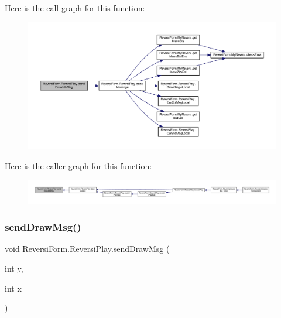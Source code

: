 Here is the call graph for this function\+:\nopagebreak
\begin{figure}[H]
\begin{center}
\leavevmode
\includegraphics[width=350pt]{class_reversi_form_1_1_reversi_play_a08062d3bd42d1780a6931b44a925503d_cgraph}
\end{center}
\end{figure}
Here is the caller graph for this function\+:\nopagebreak
\begin{figure}[H]
\begin{center}
\leavevmode
\includegraphics[width=350pt]{class_reversi_form_1_1_reversi_play_a08062d3bd42d1780a6931b44a925503d_icgraph}
\end{center}
\end{figure}
\mbox{\label{class_reversi_form_1_1_reversi_play_aaad592cdd92fb4efd6132c7cf1871e1f}} 
\subsubsection{\texorpdfstring{send\+Draw\+Msg()}{sendDrawMsg()}}
{\footnotesize\ttfamily void Reversi\+Form.\+Reversi\+Play.\+send\+Draw\+Msg (\begin{DoxyParamCaption}\item[{int}]{y,  }\item[{int}]{x }\end{DoxyParamCaption})}



